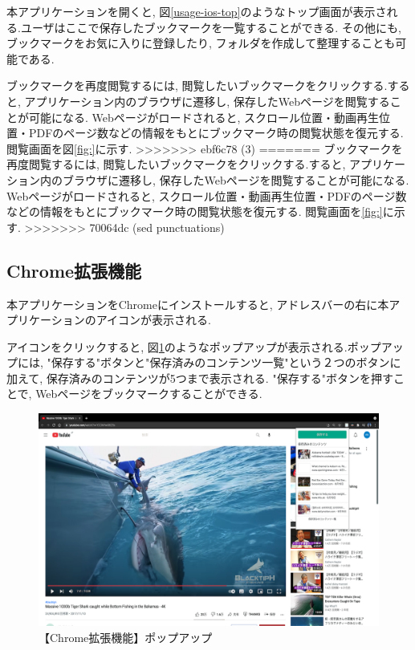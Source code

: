 本アプリケーションを開くと, 図\ref{usage-ios-top}のようなトップ画面が表示される.ユーザはここで保存したブックマークを一覧することができる.
その他にも, ブックマークをお気に入りに登録したり, フォルダを作成して整理することも可能である.

ブックマークを再度閲覧するには, 閲覧したいブックマークをクリックする.すると, アプリケーション内のブラウザに遷移し, 保存したWebページを閲覧することが可能になる.
Webページがロードされると, スクロール位置・動画再生位置・PDFのページ数などの情報をもとにブックマーク時の閲覧状態を復元する.
閲覧画面を図\ref{fig:}に示す.
>>>>>>> ebf6c78 (3)
=======
ブックマークを再度閲覧するには, 閲覧したいブックマークをクリックする.すると, アプリケーション内のブラウザに遷移し, 保存したWebページを閲覧することが可能になる.
Webページがロードされると, スクロール位置・動画再生位置・PDFのページ数などの情報をもとにブックマーク時の閲覧状態を復元する.
閲覧画面を\ref{fig:}に示す.
>>>>>>> 70064dc (sed punctuations)

\subsection{Chrome拡張機能}
本アプリケーションをChromeにインストールすると, アドレスバーの右に本アプリケーションのアイコンが表示される.

アイコンをクリックすると, 図\ref{fig:usage-chrome-popup}のようなポップアップが表示される.ポップアップには, "保存する"ボタンと"保存済みのコンテンツ一覧"という２つのボタンに加えて, 保存済みのコンテンツが5つまで表示される.
"保存する"ボタンを押すことで, Webページをブックマークすることができる.

\begin{figure}[htbp]
  \caption{【Chrome拡張機能】ポップアップ}
  \label{fig:usage-chrome-popup}
  \begin{center}
    \includegraphics[bb=0 0 915 667,width=15cm]{img/usage-chrome-popup.pdf}
  \end{center}
\end{figure}

